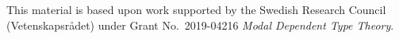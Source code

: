 \documentclass[acmsmall,review,anonymous]{acmart}\settopmatter{printfolios=true,printccs=false,printacmref=false}
\begin{document}
\begin{acks}                            %

  This material is based upon work supported by the
  Swedish Research Council (Vetenskapsrådet)
  under Grant
  No.~2019-04216 \emph{Modal Dependent Type Theory}.

\end{acks}






\end{document}
